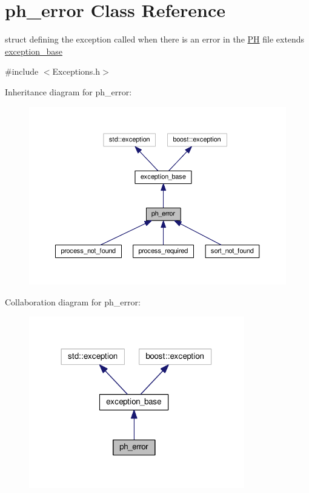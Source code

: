 \hypertarget{structph__error}{\section{ph\+\_\+error Class Reference}
\label{structph__error}
}


struct defining the exception called when there is an error in the \hyperlink{classPH}{P\+H} file extends \hyperlink{structexception__base}{exception\+\_\+base}  




{\ttfamily \#include $<$Exceptions.\+h$>$}



Inheritance diagram for ph\+\_\+error\+:\nopagebreak
\begin{figure}[H]
\begin{center}
\leavevmode
\includegraphics[width=350pt]{structph__error__inherit__graph}
\end{center}
\end{figure}


Collaboration diagram for ph\+\_\+error\+:\nopagebreak
\begin{figure}[H]
\begin{center}
\leavevmode
\includegraphics[width=266pt]{structph__error__coll__graph}
\end{center}
\end{figure}


